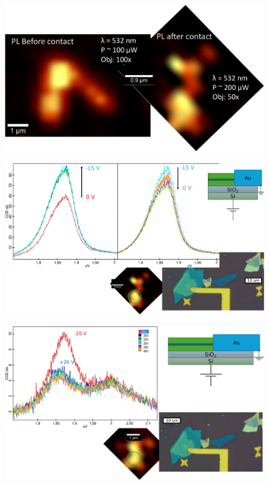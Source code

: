 \documentclass[double,12pt,1in,seploa]{beavtex}
\begin{document}
\begin{figure}
    \includegraphics[width=1\textwidth]{PL before-after contact.pdf}
    \caption{}
\end{figure}

\begin{figure}
    \includegraphics[width=1\textwidth]{First Vg PL sweeps.pdf}
    \caption{}
\end{figure}

\begin{figure}
    \includegraphics[width=1\textwidth]{Second Vg sweep.pdf}
    \caption{}
\end{figure}
\end{document}
